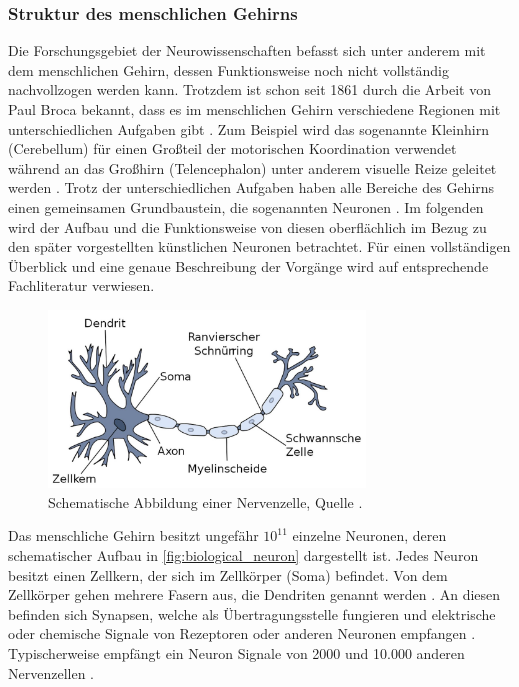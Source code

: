\subsubsection{Struktur des menschlichen Gehirns}
Die Forschungsgebiet der Neurowissenschaften befasst sich unter anderem mit dem menschlichen Gehirn, dessen Funktionsweise noch nicht vollständig nachvollzogen werden kann. Trotzdem ist schon seit 1861 durch die Arbeit von Paul Broca bekannt, dass es im menschlichen Gehirn verschiedene Regionen mit unterschiedlichen Aufgaben gibt \cite{russell2013kunstliche}. Zum Beispiel wird das sogenannte Kleinhirn (Cerebellum) für einen Großteil der motorischen Koordination verwendet während an das Großhirn (Telencephalon) unter anderem visuelle Reize geleitet werden \cite{kriesel2008kleiner}. Trotz der unterschiedlichen Aufgaben haben alle Bereiche des Gehirns einen gemeinsamen Grundbaustein, die sogenannten Neuronen \cite{russell2013kunstliche}. Im folgenden wird der Aufbau und die Funktionsweise von diesen oberflächlich im Bezug zu den später vorgestellten künstlichen Neuronen betrachtet. Für einen vollständigen Überblick und eine genaue Beschreibung der Vorgänge wird auf entsprechende Fachliteratur verwiesen.\\
\begin{figure}[h]
	\centering
	\includegraphics[width=0.75\textwidth]{./img/biologial_neuron.JPG} 
	\caption{Schematische Abbildung einer Nervenzelle, Quelle \cite{kriesel2008kleiner}.}
	\label{fig:biological_neuron}
\end{figure}
Das menschliche Gehirn besitzt ungefähr ${10}^{11}$ einzelne Neuronen, deren schematischer Aufbau in \autoref{fig:biological_neuron} dargestellt ist. Jedes Neuron besitzt einen Zellkern, der sich im Zellkörper (Soma) befindet. Von dem Zellkörper gehen mehrere Fasern aus, die Dendriten genannt werden \cite{russell2013kunstliche}. An diesen befinden sich Synapsen, welche als Übertragungsstelle fungieren und elektrische oder chemische Signale von Rezeptoren oder anderen Neuronen empfangen \cite{kriesel2008kleiner}. Typischerweise empfängt ein Neuron Signale von 2000 und 10.000 anderen Nervenzellen \cite{zell2003simulation}. \\
